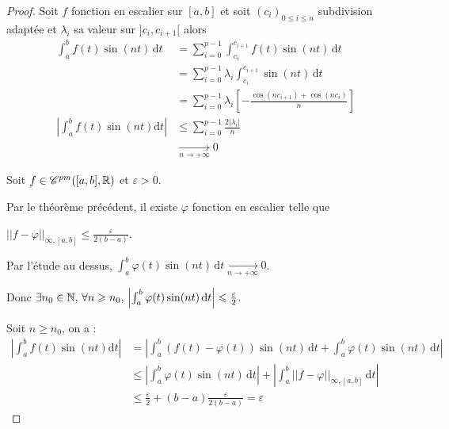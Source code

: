 
\begin{proof}
    Soit $f$ fonction en escalier sur $[a, b]$ et soit $(c_i)_{0 \leqslant i \leqslant n}$ 
    subdivision adaptée et $\lambda_i$ sa valeur sur $]c_i, c_{i + 1}[$ alors 
    \begin{align}
        \int_{a }^{b } f(t) \sin(nt) \,\mathrm{d}t & = \sum_{i = 0}^{p - 1} \int_{c_i}^{c_{i + 1}} f(t) \sin(nt) \,\mathrm{d}t \\
        & = \sum_{i = 0}^{p - 1} \lambda_i \int_{c_i}^{c_{i + 1}} \sin(nt) \,\mathrm{d}t \\
        & = \sum_{i = 0}^{p - 1} \lambda_i \left[ - \frac{\cos(nc_{i + 1}) + \cos(nc_i)}{n} \right] \\
        \left| \int_{a }^{b } f(t) \sin(nt) \mathrm d t  \right| & \leqslant \sum_{i = 0 }^{p - 1} \frac{2 |\lambda_i|}{n} \\
        & \xrightarrow[n \to + \infty ]{} 0
    \end{align}

    Soit $f \in \mathscr C^{pm}([a, b], \mathbb{R})$ et $\varepsilon > 0$.

    Par le théorème précédent, il existe $\varphi$ fonction en escalier telle que 
    
    $||f - \varphi||_{\infty, [a, b]} \leqslant \frac \varepsilon {2 (b - a)}$.

    Par l'étude au dessus, $\int_{a }^{b } \varphi(t) \sin(nt) \,\mathrm{d}t \xrightarrow[n \to + \infty ]{} 0$.

    Donc $\exists n_0 \in \mathbb{N}, \, \forall n \geqslant n_0, \, \left| \int_{a }^{b } \varphi(t) \sin(nt) \,\mathrm{d}t \right| \leqslant \frac \varepsilon 2$.

    Soit $n \geqslant n_0$, on a :
    \begin{align}
        \left| \int_a^b f(t) \sin(nt) \mathrm d t  \right| & = \left| \int_a^b (f(t) - \varphi(t)) \sin(nt) \,\mathrm{d}t + \int_a^b \varphi(t) \sin(nt) \,\mathrm{d}t \right| \\
        & \leqslant \left| \int_a^b \varphi(t) \sin(nt) \,\mathrm{d}t \right| + \left| \int_a^b ||f - \varphi||_{\infty, [a, b]} \,\mathrm{d}t \right| \\
        & \leqslant \frac \varepsilon 2 + (b - a) \frac \varepsilon {2 (b - a)} = \varepsilon
    \end{align}

\end{proof}

